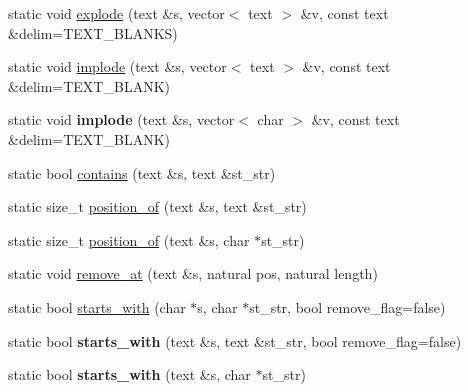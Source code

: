 \begin{DoxyCompactItemize}
\item 
static void \hyperlink{classez_1_1essential_1_1TextUtils_adb3923b874c2a4c5b3af09390985d237}{explode} (text \&s, vector$<$ text $>$ \&v, const text \&delim=T\+E\+X\+T\+\_\+\+B\+L\+A\+N\+KS)
\item 
static void \hyperlink{classez_1_1essential_1_1TextUtils_a41ebdaae7465cb3d124c54ecc68580fa}{implode} (text \&s, vector$<$ text $>$ \&v, const text \&delim=T\+E\+X\+T\+\_\+\+B\+L\+A\+NK)
\item 
\mbox{\label{classez_1_1essential_1_1TextUtils_a3fc22ea5febf687e482e2c8fa995e013}} 
static void {\bfseries implode} (text \&s, vector$<$ char $>$ \&v, const text \&delim=T\+E\+X\+T\+\_\+\+B\+L\+A\+NK)
\item 
static bool \hyperlink{classez_1_1essential_1_1TextUtils_ad70575b0f44335fb0714513f5b730d82}{contains} (text \&s, text \&st\+\_\+str)
\item 
static size\+\_\+t \hyperlink{classez_1_1essential_1_1TextUtils_ad53a4ce5a4bb9e9851dc193c00052120}{position\+\_\+of} (text \&s, text \&st\+\_\+str)
\item 
static size\+\_\+t \hyperlink{classez_1_1essential_1_1TextUtils_ad7c2a4481c49b567bd49ca7fb17ec009}{position\+\_\+of} (text \&s, char $\ast$st\+\_\+str)
\item 
static void \hyperlink{classez_1_1essential_1_1TextUtils_aee82679b210251b3a50fe11533eda971}{remove\+\_\+at} (text \&s, natural pos, natural length)
\item 
static bool \hyperlink{classez_1_1essential_1_1TextUtils_a1d36db6f2b9d9f2225936f73e5c9d35f}{starts\+\_\+with} (char $\ast$s, char $\ast$st\+\_\+str, bool remove\+\_\+flag=false)
\item 
\mbox{\label{classez_1_1essential_1_1TextUtils_a66372366571e38a079cbe92359402d12}} 
static bool {\bfseries starts\+\_\+with} (text \&s, text \&st\+\_\+str, bool remove\+\_\+flag=false)
\item 
\mbox{\label{classez_1_1essential_1_1TextUtils_a6458222eea7e8537910e60f4e7f11109}} 
static bool {\bfseries starts\+\_\+with} (text \&s, char $\ast$st\+\_\+str)
\item 
\mbox{\label{classez_1_1essential_1_1TextUtils_a1f6a93a88ba8f8af57ea1348bbbdd730}} 

\end{DoxyCompactItemize}
